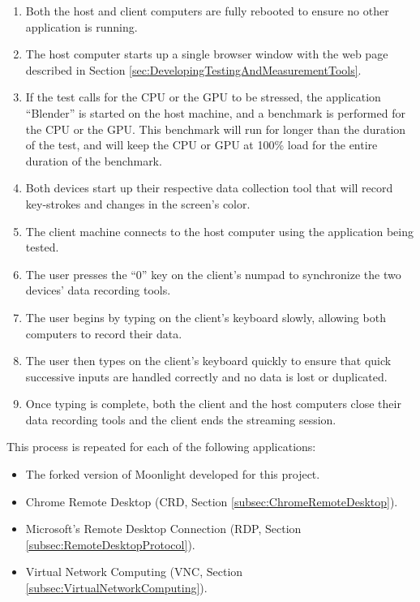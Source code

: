 \begin{enumerate}
  \item Both the host and client computers are fully rebooted to ensure no other application is running.
  \item The host computer starts up a single browser window with the web page described in Section \ref{sec:DevelopingTestingAndMeasurementTools}.
  \item If the test calls for the CPU or the GPU to be stressed, the application \enquote{Blender} is started on the host machine, and a benchmark is performed for the CPU or the GPU.
        This benchmark will run for longer than the duration of the test, and will keep the CPU or GPU at 100\% load for the entire duration of the benchmark.
  \item Both devices start up their respective data collection tool that will record key-strokes and changes in the screen's color.
  \item The client machine connects to the host computer using the application being tested.
  \item The user presses the \enquote{0} key on the client's numpad to synchronize the two devices' data recording tools.
  \item The user begins by typing on the client's keyboard slowly, allowing both computers to record their data.
  \item The user then types on the client's keyboard quickly to ensure that quick successive inputs are handled correctly and no data is lost or duplicated.
  \item Once typing is complete, both the client and the host computers close their data recording tools and the client ends the streaming session.
\end{enumerate}

\noindent
This process is repeated for each of the following applications:

\begin{itemize}
  \item The forked version of Moonlight developed for this project.
  \item Chrome Remote Desktop (CRD, Section \ref{subsec:ChromeRemoteDesktop}).
  \item Microsoft's Remote Desktop Connection (RDP, Section \ref{subsec:RemoteDesktopProtocol}).
  \item Virtual Network Computing (VNC, Section \ref{subsec:VirtualNetworkComputing}).
\end{itemize}

